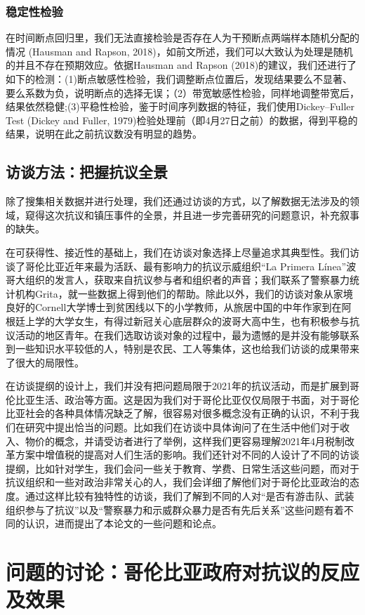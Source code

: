 \documentclass{phyasgn}\usepackage{nag}
\begin{document}
\subsubsection{稳定性检验}
在时间断点回归里，我们无法直接检验是否存在人为干预断点两端样本随机分配的情况 (Hausman and Rapson, 2018)，如前文所述，我们可以大致认为处理是随机的并且不存在预期效应。依据Hausman and Rapson (2018)的建议，我们还进行了如下的检测：(1)断点敏感性检验，我们调整断点位置后，发现结果要么不显著、要么系数为负，说明断点的选择无误；（2）带宽敏感性检验，同样地调整带宽后，结果依然稳健;(3)平稳性检验，鉴于时间序列数据的特征，我们使用Dickey–Fuller Test (Dickey and Fuller, 1979)检验处理前（即4月27日之前）的数据，得到平稳的结果，说明在此之前抗议数没有明显的趋势。
\subsection{访谈方法：把握抗议全景}
除了搜集相关数据并进行处理，我们还通过访谈的方式，以了解数据无法涉及的领域，窥得这次抗议和镇压事件的全景，并且进一步完善研究的问题意识，补充叙事的缺失。
\par 在可获得性、接近性的基础上，我们在访谈对象选择上尽量追求其典型性。我们访谈了哥伦比亚近年来最为活跃、最有影响力的抗议示威组织“La Primera Línea”波哥大组织的发言人，获取来自抗议参与者和组织者的声音；我们联系了警察暴力统计机构Grita，就一些数据上得到他们的帮助。除此以外，我们的访谈对象从家境良好的Cornell大学博士到贫困线以下的小学教师，从旅居中国的中年作家到在阿根廷上学的大学女生，有得过新冠关心底层群众的波哥大高中生，也有积极参与抗议活动的地区青年。在我们选取访谈对象的过程中，最为遗憾的是并没有能够联系到一些知识水平较低的人，特别是农民、工人等集体，这也给我们访谈的成果带来了很大的局限性。
\par 在访谈提纲的设计上，我们并没有把问题局限于2021年的抗议活动，而是扩展到哥伦比亚生活、政治等方面。这是因为我们对于哥伦比亚仅仅局限于书面，对于哥伦比亚社会的各种具体情况缺乏了解，很容易对很多概念没有正确的认识，不利于我们在研究中提出恰当的问题。比如我们在访谈中具体询问了在生活中他们对于收入、物价的概念，并请受访者进行了举例，这样我们更容易理解2021年4月税制改革方案中增值税的提高对人们生活的影响。我们还针对不同的人设计了不同的访谈提纲，比如针对学生，我们会问一些关于教育、学费、日常生活这些问题，而对于抗议组织和一些对政治非常关心的人，我们会详细了解他们对于哥伦比亚政治的态度。通过这样比较有独特性的访谈，我们了解到不同的人对“是否有游击队、武装组织参与了抗议”以及“警察暴力和示威群众暴力是否有先后关系”这些问题有着不同的认识，进而提出了本论文的一些问题和论点。
\section{问题的讨论：哥伦比亚政府对抗议的反应及效果}
\end{document}
